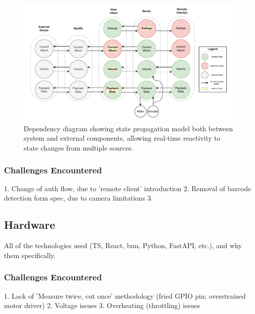             \begin{figure}[h]
                \centering
                \includegraphics[width=\textwidth]{images/VTT_states.DependencyGraph.pdf}
                \caption{Dependency diagram showing state propagation model both between system and external components, allowing real-time reactivity to state changes from multiple sources.}
                \label{fig:statePropagationDiagram}
            \end{figure}
        
            \subsubsection{Challenges Encountered}
                \begin{temp}
                    1. Change of auth flow, due to 'remote client' introduction
                    2. Removal of barcode detection form spec, due to camera limitations
                    3. \cite{spotify2025security}
                \end{temp}
    
        \subsection{Hardware}
    
            \begin{temp}
                All of the technologies used (TS, React, bun, Python, FastAPI, etc.), and why them specifically.
            \end{temp}
        
            \subsubsection{Challenges Encountered}
                \begin{temp}
                    1. Lack of 'Measure twice, cut once' methodology (fried GPIO pin; overstrained motor driver)
                    2. Voltage issues
                    3. Overheating (throttling) issues
                \end{temp}
    
